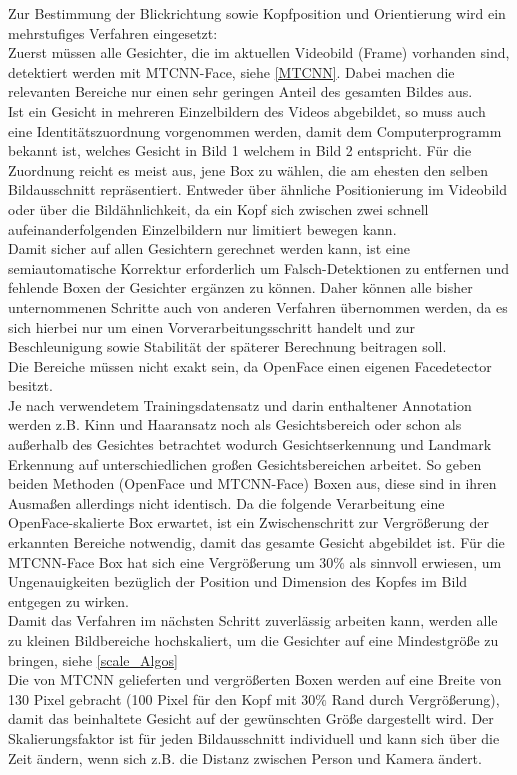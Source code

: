 \label{Implementierung_Ablauf}

Zur Bestimmung der Blickrichtung sowie Kopfposition und Orientierung wird ein mehrstufiges Verfahren eingesetzt:\\
Zuerst müssen alle Gesichter, die im aktuellen Videobild (Frame) vorhanden sind, detektiert werden mit MTCNN-Face, siehe \autoref{MTCNN}. Dabei machen die relevanten Bereiche nur einen sehr geringen Anteil des gesamten Bildes aus.\\
Ist ein Gesicht in mehreren Einzelbildern des Videos abgebildet, so muss auch eine Identitätszuordnung vorgenommen werden, damit dem Computerprogramm bekannt ist, welches Gesicht in Bild 1 welchem in Bild 2 entspricht. Für die Zuordnung reicht es meist aus, jene Box zu wählen, die am ehesten den selben Bildausschnitt repräsentiert. Entweder über ähnliche Positionierung im Videobild oder über die Bildähnlichkeit, da ein Kopf sich zwischen zwei schnell aufeinanderfolgenden Einzelbildern nur limitiert bewegen kann.\\
Damit sicher auf allen Gesichtern gerechnet werden kann, ist eine semiautomatische Korrektur erforderlich um Falsch-Detektionen zu entfernen und fehlende Boxen der Gesichter ergänzen zu können. Daher können alle bisher unternommenen Schritte auch von anderen Verfahren übernommen werden, da es sich hierbei nur um einen Vorverarbeitungsschritt handelt und zur Beschleunigung sowie Stabilität der späterer Berechnung beitragen soll.\\
Die Bereiche müssen nicht exakt sein, da OpenFace einen eigenen Facedetector besitzt.\\
Je nach verwendetem Trainingsdatensatz und darin enthaltener Annotation werden z.B. Kinn und Haaransatz noch als Gesichtsbereich oder schon als außerhalb des Gesichtes betrachtet wodurch  Gesichtserkennung und Landmark Erkennung auf unterschiedlichen großen Gesichtsbereichen arbeitet. So geben beiden Methoden (OpenFace und MTCNN-Face) Boxen aus, diese sind in ihren Ausmaßen allerdings nicht identisch. Da die folgende Verarbeitung eine OpenFace-skalierte Box erwartet, ist ein Zwischenschritt zur Vergrößerung der erkannten Bereiche notwendig, damit das gesamte Gesicht abgebildet ist. Für die MTCNN-Face Box hat sich eine Vergrößerung um $30\%$ als sinnvoll erwiesen, um Ungenauigkeiten bezüglich der Position und Dimension des Kopfes im Bild entgegen zu wirken.\\
Damit das Verfahren im nächsten Schritt zuverlässig arbeiten kann, werden alle zu kleinen Bildbereiche hochskaliert, um die Gesichter auf eine Mindestgröße zu bringen, siehe \autoref{scale_Algos}\\ Die von MTCNN gelieferten und vergrößerten Boxen werden auf eine Breite von 130 Pixel gebracht (100 Pixel für den Kopf mit $30\%$ Rand durch Vergrößerung), damit das beinhaltete Gesicht auf der gewünschten Größe dargestellt wird. Der Skalierungsfaktor ist für jeden Bildausschnitt individuell und kann sich über die Zeit ändern, wenn sich z.B. die Distanz zwischen Person und Kamera ändert.\\
